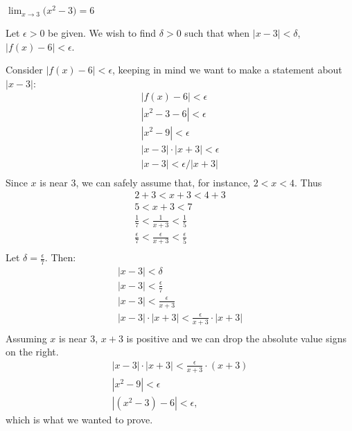 {$\displaystyle \lim_{x\to 3} \big(x^2-3\big) = 6$}
{Let $\epsilon >0$ be given. We wish to find $\delta >0$ such that when $|x-3|<\delta$, $|f(x)-6|<\epsilon$. 

Consider $|f(x)-6|<\epsilon$, keeping in  mind we want to make a statement about $|x-3|$:
\begin{gather*}
|f(x) -6 | < \epsilon \\
|x^2-3 -6 |<\epsilon \\
| x^2-9 | < \epsilon \\
| x-3 |\cdot|x+3| < \epsilon \\
| x-3 | < \epsilon/|x+3| \\
\end{gather*}
Since $x$ is near 3, we can safely assume that, for instance, $2<x<4$. Thus
\begin{gather*}
2+3<x+3<4+3 \\
5 < x+3 < 7 \\
\frac{1}{7} < \frac{1}{x+3} < \frac{1}{5} \\
\frac{\epsilon}{7} < \frac{\epsilon}{x+3} < \frac{\epsilon}{5} \\
\end{gather*}
Let $\delta =\frac{\epsilon}{7}$. Then:
\begin{gather*}
|x-3|<\delta \\
|x-3| < \frac{\epsilon}7\\
|x-3| < \frac{\epsilon}{x+3}\\
|x-3|\cdot|x+3| < \frac{\epsilon}{x+3}\cdot|x+3|\\
\end{gather*}
Assuming $x$ is near 3, $x+3$ is positive and we can drop the absolute value signs on the right.
\begin{gather*}
|x-3|\cdot|x+3| < \frac{\epsilon}{x+3}\cdot(x+3)\\
|x^2-9| < \epsilon\\
|(x^2-3) - 6| < \epsilon,
\end{gather*}
which is what we wanted to prove.
}


